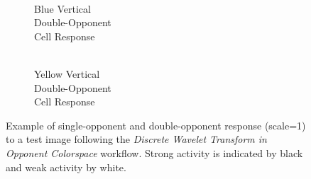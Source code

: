 \documentclass[journal,onecolumn]{IEEEtran}
\begin{document}
\begin{figure}[H]
\begin{subfigure}{0.15\textwidth}
        \caption{\\ Blue Vertical\\ Double-Opponent\\ Cell Response}
    \end{subfigure}
    \begin{subfigure}{0.15\textwidth}
        \centering
        \captionsetup{justification=centering}
        \caption{\\ Yellow Vertical\\ Double-Opponent\\ Cell Response}
    \end{subfigure}%
    \caption{Example of single-opponent and double-opponent response (scale=1) to a test image following the \textit{Discrete Wavelet Transform in Opponent Colorspace} workflow. Strong activity is indicated by black and weak activity by white.}
    \label{fig:transform-dwt}
\end{figure}

\end{document}
